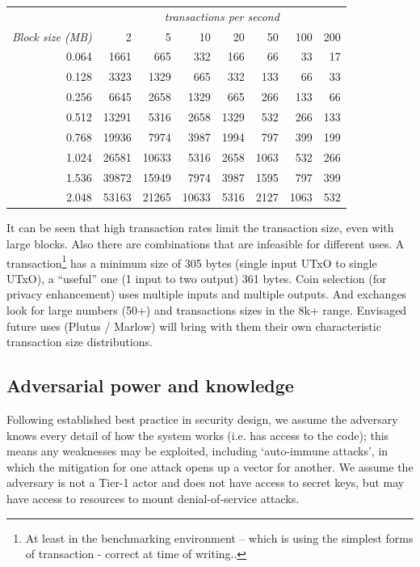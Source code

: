 \documentclass[11pt,a4paper]{article}
\begin{document}
\begin{table}
  \caption{Transaction size as a function of block size and transactions per
  second}
  \label{table:transaction-size}
\begin{longtable}[]{r|rrrrrrr}
\toprule
  & \multicolumn{7}{c}{\textit{transactions per second}}\tabularnewline
\textit{Block size (MB)} & 2 & 5 & 10 & 20 & 50 & 100 & 200\tabularnewline
\midrule
\endhead
0.064 & 1661 & 665 & 332 & 166 & 66 & 33 & 17\tabularnewline
0.128 & 3323 & 1329 & 665 & 332 & 133 & 66 & 33\tabularnewline
0.256 & 6645 & 2658 & 1329 & 665 & 266 & 133 & 66\tabularnewline
0.512 & 13291 & 5316 & 2658 & 1329 & 532 & 266 & 133\tabularnewline
0.768 & 19936 & 7974 & 3987 & 1994 & 797 & 399 & 199\tabularnewline
1.024 & 26581 & 10633 & 5316 & 2658 & 1063 & 532 & 266\tabularnewline
1.536 & 39872 & 15949 & 7974 & 3987 & 1595 & 797 & 399\tabularnewline
2.048 & 53163 & 21265 & 10633 & 5316 & 2127 & 1063 & 532\tabularnewline
\bottomrule
\end{longtable}
\end{table}

It can be seen that high transaction rates limit the transaction size,
even with large blocks. Also there are combinations that are infeasible
for different uses. A transaction\footnote{At least in the benchmarking
  environment -- which is using the simplest forms of transaction -
  correct at time of writing..} has a {minimum size of 305 bytes} (single
input UTxO to single UTxO), a ``useful'' one (1 input to two output) 361
bytes. Coin selection (for privacy enhancement) uses multiple inputs and
multiple outputs. And exchanges look for large numbers (50+) and
transactions sizes in the 8k+ range. Envisaged future uses (Plutus /
Marlow) will bring with them their own characteristic transaction size
distributions.

\subsection{Adversarial power and knowledge}
\label{adversarial-power-and-knowledge}

Following established best practice in security design, we assume the
adversary knows every detail of how the system works (i.e. has access to
the code); this means any weaknesses may be exploited, including
`auto-immune attacks', in which the mitigation for one attack opens up a
vector for another. We assume the adversary is not a Tier-1 actor and
does not have access to secret keys, but may have access to resources to
mount denial-of-service attacks.
\end{document}
